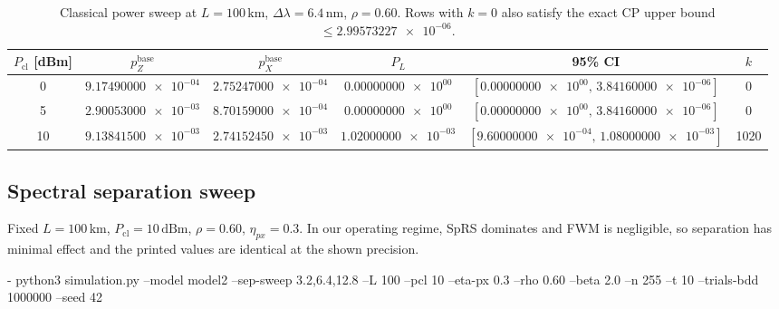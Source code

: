 \documentclass[conference]{IEEEtran}
\newcommand{\nexact}[1]{\num[round-mode=off]{#1}}
\newcommand{\simL}{100}
\newcommand{\simpcl}{10}
\newcommand{\simsep}{6.4}
\newcommand{\simeta}{0.3}
\newcommand{\simn}{255}
\newcommand{\simt}{10}
\newcommand{\simtrials}{1000000}
\newcommand{\simseed}{42}
\newcommand{\simpz}{9.13841500e-03}
\newcommand{\simpx}{2.74152450e-03}
\newcommand{\simrhoB}{0.60}
\newcommand{\simpLB}{1.02000000e-03}
\newcommand{\simpLBlo}{9.60000000e-04}
\newcommand{\simpLBhi}{1.08000000e-03}
\newcommand{\simkB}{1020}
\newcommand{\simCPUpperZero}{2.99573227e-06}
\newcommand{\simpclA}{0}
\newcommand{\simpzPclA}{9.17490000e-04}
\newcommand{\simpxPclA}{2.75247000e-04}
\newcommand{\simpLPclA}{0.00000000e+00}
\newcommand{\simpLPclAlo}{0.00000000e+00}
\newcommand{\simpLPclAhi}{3.84160000e-06}
\newcommand{\simkPclA}{0}
\newcommand{\simpclB}{5}
\newcommand{\simpzPclB}{2.90053000e-03}
\newcommand{\simpxPclB}{8.70159000e-04}
\newcommand{\simpLPclB}{0.00000000e+00}
\newcommand{\simpLPclBlo}{0.00000000e+00}
\newcommand{\simpLPclBhi}{3.84160000e-06}
\newcommand{\simkPclB}{0}
\newcommand{\simpclC}{10}
\newcommand{\simsepA}{3.2}
\newcommand{\simsepB}{12.8}
\begin{document}
\begin{table}[t!]
\small
\centering
\caption{Classical power sweep at \(L=\simL\,\mathrm{km}\), \(\Delta\lambda=\simsep\,\mathrm{nm}\), \(\rho=\simrhoB\). Rows with \(k=0\) also satisfy the exact CP upper bound \(\le\nexact{\simCPUpperZero}\).}
\label{tab:power}
\begin{adjustbox}{width=\linewidth}
\begin{tabular}{cccccc}
\toprule
\(P_{\mathrm{cl}}\) [dBm] & \(p_Z^{\text{base}}\) & \(p_X^{\text{base}}\) & \(P_L\) & 95\% CI & \(k\) \\
\midrule
\simpclA & \(\nexact{\simpzPclA}\) & \(\nexact{\simpxPclA}\) & \(\nexact{\simpLPclA}\) & \([\nexact{\simpLPclAlo},\,\nexact{\simpLPclAhi}]\) & \simkPclA \\
\simpclB & \(\nexact{\simpzPclB}\) & \(\nexact{\simpxPclB}\) & \(\nexact{\simpLPclB}\) & \([\nexact{\simpLPclBlo},\,\nexact{\simpLPclBhi}]\) & \simkPclB \\
\simpclC & \(\nexact{\simpz}\) & \(\nexact{\simpx}\) & \(\nexact{\simpLB}\) & \([\nexact{\simpLBlo},\,\nexact{\simpLBhi}]\) & \simkB \\
\bottomrule
\end{tabular}
\end{adjustbox}
\end{table}

\subsection{Spectral separation sweep}
Fixed \(L=\simL\,\mathrm{km}\), \(P_{\mathrm{cl}}=\simpcl\,\mathrm{dBm}\), \(\rho=\simrhoB\), \(\eta_{px}=\simeta\). In our operating regime, SpRS dominates and FWM is negligible, so separation has minimal effect and the printed values are identical at the shown precision.

- python3 simulation.py --model model2 --sep-sweep \simsepA{},\simsep{},\simsepB{} --L \simL{} --pcl \simpcl{} --eta-px \simeta{} --rho \simrhoB{} --beta 2.0 --n \simn{} --t \simt{} --trials-bdd \simtrials{} --seed \simseed
\end{document}
